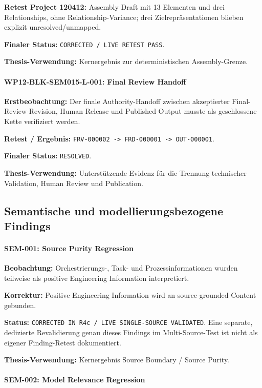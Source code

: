 \textbf{Retest Project 120412:}
Assembly Draft mit 13 Elementen und drei Relationships, ohne Relationship-Variance;
drei Zielrepräsentationen blieben explizit unresolved/unmapped.

\textbf{Finaler Status:}
\texttt{CORRECTED / LIVE RETEST PASS}.

\textbf{Thesis-Verwendung:}
Kernergebnis zur deterministischen Assembly-Grenze.


\paragraph{WP12-BLK-SEM015-L-001: Final Review Handoff}

\textbf{Erstbeobachtung:}
Der finale Authority-Handoff zwischen akzeptierter Final-Review-Revision,
Human Release und Published Output musste als geschlossene Kette verifiziert werden.

\textbf{Retest / Ergebnis:}
\texttt{FRV-000002 -> FRD-000001 -> OUT-000001}.

\textbf{Finaler Status:}
\texttt{RESOLVED}.

\textbf{Thesis-Verwendung:}
Unterstützende Evidenz für die Trennung technischer Validation, Human Review und
Publication.


\subsection{Semantische und modellierungsbezogene Findings}

\paragraph{SEM-001: Source Purity Regression}

\textbf{Beobachtung:}
Orchestrierungs-, Task- und Prozessinformationen wurden teilweise als positive
Engineering Information interpretiert.

\textbf{Korrektur:}
Positive Engineering Information wird an source-grounded Content gebunden.

\textbf{Status:}
\texttt{CORRECTED IN R4c / LIVE SINGLE-SOURCE VALIDATED}. Eine separate,
dedizierte Revalidierung genau dieses Findings im Multi-Source-Test ist nicht
als eigener Finding-Retest dokumentiert.

\textbf{Thesis-Verwendung:}
Kernergebnis Source Boundary / Source Purity.


\paragraph{SEM-002: Model Relevance Regression}

